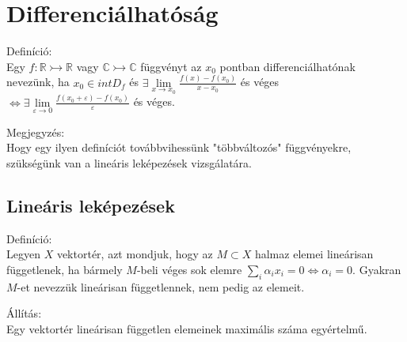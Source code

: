 \documentclass[12pt,a4paper]{scrartcl}
\newenvironment{definicio}{}{}
\newenvironment{allitas}{}{}
\newenvironment{megjegyzes}{}{}
\begin{document}
\hypertarget{differencialhatosag}{%
\section{Differenciálhatóság}\label{differencialhatosag}}

\begin{definicio}

Definíció:\\
Egy \(\left. f:{\mathbb{R}}\rightarrowtail{\mathbb{R}} \right.\) vagy
\(\left. {\mathbb{C}}\rightarrowtail{\mathbb{C}} \right.\) függvényt az
\(x_{0}\) pontban differenciálhatónak nevezünk, ha
\(x_{0} \in {int}D_{f}\) és
\(\exists\underset{x\rightarrow x_{0}}{\lim}\frac{f\left( x \right) - f\left( x_{0} \right)}{x - x_{0}}\)
és véges
\(\left. \Leftrightarrow\exists\underset{\varepsilon\rightarrow 0}{\lim}\frac{f\left( {x_{0} + \varepsilon} \right) - f\left( x_{0} \right)}{\varepsilon} \right.\)
és véges.

\end{definicio}

\begin{megjegyzes}

Megjegyzés:\\
Hogy egy ilyen definíciót továbbvihessünk "többváltozós" függvényekre,
szükségünk van a lineáris leképezések vizsgálatára.

\end{megjegyzes}

\hypertarget{linearis-lekepezesek}{%
\subsection{Lineáris leképezések}\label{linearis-lekepezesek}}

\begin{definicio}

Definíció:\\
Legyen \(X\) vektortér, azt mondjuk, hogy az \(M \subset X\) halmaz
elemei lineárisan függetlenek, ha bármely \(M\)-beli véges sok elemre
\(\left. {\sum\limits_{i}{\alpha_{i}x_{i}}} = 0\Leftrightarrow\alpha_{i} = 0 \right.\).
Gyakran \(M\)-et nevezzük lineárisan függetlennek, nem pedig az elemeit.

\end{definicio}

\begin{allitas}

Állítás:\\
Egy vektortér lineárisan független elemeinek maximális száma egyértelmű.

\end{allitas}
\end{document}
